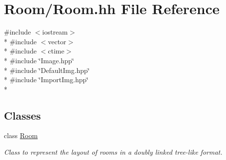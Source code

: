 \hypertarget{Room_8hh}{\section{Room/\-Room.hh File Reference}
\label{Room_8hh}
}
{\ttfamily \#include $<$iostream$>$}\\*
{\ttfamily \#include $<$vector$>$}\\*
{\ttfamily \#include $<$ctime$>$}\\*
{\ttfamily \#include \char`\"{}Image.\-hpp\char`\"{}}\\*
{\ttfamily \#include \char`\"{}Default\-Img.\-hpp\char`\"{}}\\*
{\ttfamily \#include \char`\"{}Import\-Img.\-hpp\char`\"{}}\\*
\subsection*{Classes}
\begin{DoxyCompactItemize}
\item 
class \hyperlink{classRoom}{Room}
\begin{DoxyCompactList}\small\item\em Class to represent the layout of rooms in a doubly linked tree-\/like format. \end{DoxyCompactList}\end{DoxyCompactItemize}
